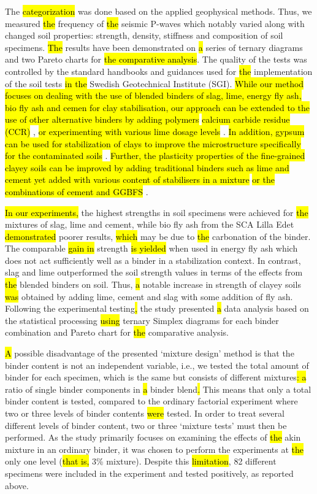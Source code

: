 \documentclass[constrmater,article,submit,pdftex,moreauthors]{Definitions/mdpi}
\begin{document}
The \hl{categorization} was done based on the applied geophysical methods. Thus, we measured \hl{the }frequency of \hl{the }seismic P-waves which notably varied along with changed soil properties: strength, density, stiffness and composition of soil specimens. \hl{The }results have been demonstrated on \hl{a }series of ternary diagrams and two Pareto charts for \hl{the comparative analysis}. The quality of the tests was controlled by the standard handbooks and guidances used for \hl{the }implementation of the soil tests \hl{in the} Swedish Geotechnical Institute (SGI). \hl{While our method focuses on dealing with the use of blended binders of slag, lime, energy fly ash, bio fly ash and cemen for clay stabilisation, our approach can be extended to the use of other alternative binders by adding polymers} \cite{Rezaeimalek} \hl{calcium carbide residue (CCR)} \cite{Horpibulsuk}, \hl{or experimenting with various lime dosage levels} \cite{Pedarla}. \hl{In addition, gypsum can be used for stabilization of clays to improve the microstructure specifically for the contaminated soils} \cite{Latifi}. \hl{Further, the plasticity properties of the fine-grained clayey soils can be improved by adding traditional binders such as lime and cement yet added with various content of stabilisers in a mixture} \cite{Mutaz,Rogers} \hl{or the combinations of cement and GGBFS} \cite{Andersson}.

\hl{In our experiments, }the highest strengths in soil specimens were achieved for \hl{the }mixtures of slag, lime and cement, while bio fly ash from the SCA Lilla Edet \hl{demonstrated} poorer results, \hl{which} may be due to \hl{the }carbonation of the binder. The comparable \hl{gain in }strength \hl{is yielded} when used in energy fly ash which does not act sufficiently well as a binder in a stabilization context. In contrast, slag and lime outperformed the soil strength values in terms of the effects from \hl{the }blended binders on soil. Thus, \hl{a }notable increase in strength of clayey soils \hl{was} obtained by adding lime, cement and slag\hl{ }with some addition of fly ash. Following the experimental testing\hl{, }the study presented \hl{a }data analysis based on the statistical processing \hl{using} ternary\hl{ }Simplex\hl{ }diagrams for each binder combination and Pareto chart for \hl{the }comparative analysis. 

\hl{A }possible disadvantage of the presented ‘mixture design’ method is that the binder content is not an independent variable, i.e., we tested the total amount of binder for each specimen, which is the same but consists of different mixtures\hl{: a }ratio of single binder components in \hl{a }binder blend\hl{. }This means that only a total binder content is tested, compared to the ordinary factorial experiment where two or three levels of binder contents \hl{were} tested. In order to treat several different levels of binder content, two or three ‘mixture tests’ must then be performed. As the study primarily focuses on examining the effects of \hl{the }akin mixture in an ordinary binder, it was chosen to perform the experiments at \hl{the }only one level (\hl{that is, }3\% mixture). Despite this \hl{limitation}, 82 different specimens were included in the experiment and tested positively, as reported above. 
\end{document}
